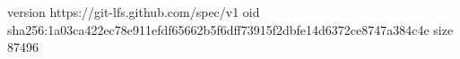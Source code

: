 version https://git-lfs.github.com/spec/v1
oid sha256:1a03ca422ec78e911efdf65662b5f6dff73915f2dbfe14d6372ce8747a384c4e
size 87496
